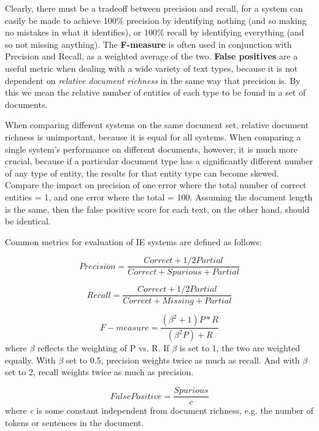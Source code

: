 Clearly, there must be a tradeoff between precision and recall, for a
system can easily be made to achieve 100\% precision by identifying
nothing (and so making no mistakes in what it identifies), or 100\%
recall by identifying everything (and so not missing anything). The
\textbf{F-measure} \cite{van79} is often used in conjunction with 
Precision and Recall, as a weighted average of the two. 
\textbf{False positives} are a
useful metric when dealing with a wide variety of text types, because
it is not dependent on \textit{relative document richness} in the same way that
precision is. By this we mean the relative number of entities of each type
to be found in a set of documents.

When comparing different systems on the same document set, relative
document richness is unimportant, because it is equal for all
systems. When comparing a single system's performance on different
documents, however, it is much more crucial, because if a particular
document type has a significantly different number of any type of
entity, the results for that entity type can become skewed.
Compare the impact on precision of
one error where the total number of correct entities = 1, and one
error where the total = 100. Assuming the document length is the
same, then the false positive score for each text, on the other hand, 
should be identical.

Common metrics for evaluation of IE systems are defined as follows:

\begin{equation}
 Precision = \frac{Correct + 1/2 Partial}{Correct + Spurious + Partial}
\end{equation}

\begin{equation}
 Recall = \frac{Correct + 1/2 Partial}{Correct + Missing + Partial}
\end{equation}

\begin{equation}
F-measure = \frac{(\beta^2 + 1) P * R}{(\beta^2P) + R}
\end{equation}
where $\beta$ reflects the weighting of P vs. R. If $\beta$ is set to 1, the
two are weighted equally. With $\beta$ set to 0.5, precision weights twice
as much as recall. And with $\beta$ set to 2, recall weights twice as much
as precision.

\begin{equation}
False Positive = \frac{Spurious}{c}
\end{equation}
where \textit{c} is some constant independent from document
richness, e.g. the number of tokens or sentences in the document.

